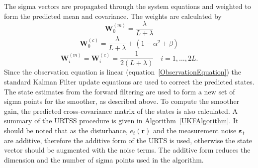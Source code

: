 \documentclass[12pt]{iopart}
\begin{document}
The sigma vectors are propagated through the system equations and weighted to form the predicted mean and covariance. The weights are calculated by 
\begin{equation}
	\mathbf W_0^{(m)}=\frac{\lambda}{ L+\lambda} 
\end{equation}
\begin{equation}
	\mathbf W_0^{(c)}=\frac{\lambda}{ L+\lambda}+(1-\alpha^2+\beta) 
\end{equation}
\begin{equation}
	\mathbf W_i^{(m)}=\mathbf W_i^{(c)}=\frac{1}{2( L+\lambda)} \quad i=1, \dots, 2L. 
\end{equation}
Since the observation equation is linear (equation~\ref{ObservationEquation}) the standard Kalman Filter update equations are  used to correct the predicted states. The state estimates from the forward filtering are used to form a new set of sigma points for the smoother, as described above. To compute the smoother gain, the predicted cross-covariance matrix of the states is also calculated. A summary of the URTSS procedure is given in Algorithm~\ref{UKFAlgorithm}. It should be noted that as the disturbance, $e_t\left(\mathbf{r}\right)$ and the measurement noise $ \boldsymbol{\varepsilon}_t$ are additive, therefore the additive form of the URTS is used, otherwise the state vector should be augmented with the noise terms. The additive form reduces the dimension and the number of sigma points used in the algorithm.
\end{document}

